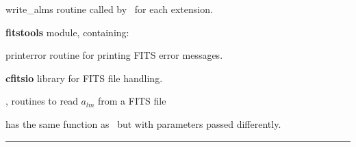 \begin{modules}
  \begin{sulist}{} %
  \item[write\_alms] routine called by \thedocid\ for each extension.
  \item[\textbf{fitstools}] module, containing:
  \item[printerror] routine for printing FITS error messages.
  \item[\textbf{cfitsio}] library for FITS file handling.		
  \end{sulist}
\end{modules}
\newpage
\begin{related}
  \begin{sulist}{} %
  \item[\htmlref{fits2alms}{sub:fits2alms},
  \htmlref{read\_conbintab}{sub:read_conbintab}] routines to read $a_{lm}$ from
  a FITS file 
  \item[\htmlref{dump\_alms}{sub:dump_alms}] has the same function as \thedocid\ but with parameters passed differently.
  \end{sulist}
\end{related}

\rule{\hsize}{2mm}

\newpage
